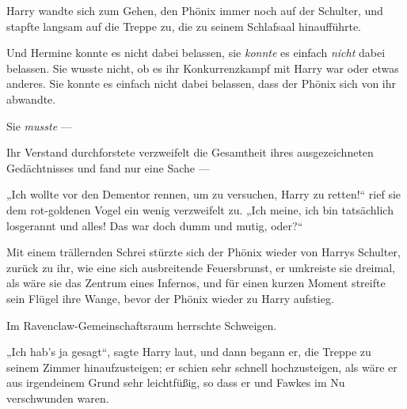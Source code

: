 Harry wandte sich zum Gehen, den Phönix immer noch auf der Schulter, und stapfte langsam auf die Treppe zu, die zu seinem Schlafsaal hinaufführte.

Und Hermine konnte es nicht dabei belassen, sie \emph{konnte} es einfach \emph{nicht} dabei belassen. Sie wusste nicht, ob es ihr Konkurrenzkampf mit Harry war oder etwas anderes. Sie konnte es einfach nicht dabei belassen, dass der Phönix sich von ihr abwandte.

Sie \emph{musste} —

Ihr Verstand durchforstete verzweifelt die Gesamtheit ihres ausgezeichneten Gedächtnisses und fand nur eine Sache —

„Ich wollte vor den Dementor rennen, um zu versuchen, Harry zu retten!“ rief sie dem rot-goldenen Vogel ein wenig verzweifelt zu.
„Ich meine, ich bin tatsächlich losgerannt und alles! Das war doch dumm und mutig, oder?“

Mit einem trällernden Schrei stürzte sich der Phönix wieder von Harrys Schulter, zurück zu ihr, wie eine sich ausbreitende Feuersbrunst, er umkreiste sie dreimal, als wäre sie das Zentrum eines Infernos, und für einen kurzen Moment streifte sein Flügel ihre Wange, bevor der Phönix wieder zu Harry aufstieg.

Im Ravenclaw-Gemeinschaftsraum herrschte Schweigen.

„Ich hab’s ja gesagt“, sagte Harry laut, und dann begann er, die Treppe zu seinem Zimmer hinaufzusteigen; er schien sehr schnell hochzusteigen, als wäre er aus irgendeinem Grund sehr leichtfüßig, so dass er und Fawkes im Nu verschwunden waren.

